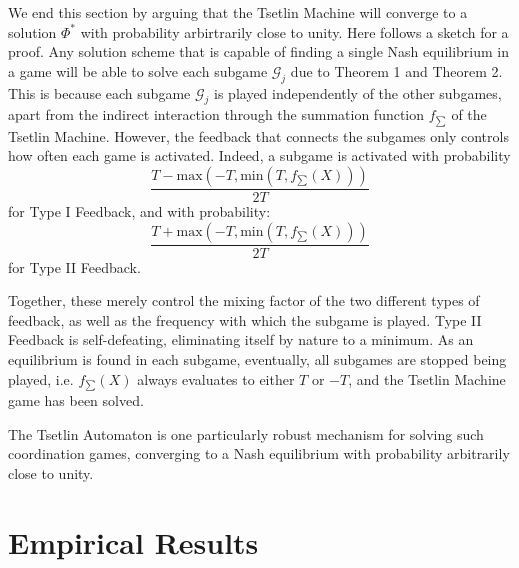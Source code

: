 \documentclass[11pt,a4paper]{article}
\begin{document}
We end this section by arguing that the Tsetlin Machine will converge to a solution $\Phi^*$ with probability arbirtrarily close to unity. Here follows a sketch for a proof. Any solution scheme that is capable of finding a single Nash equilibrium in a game will be able to solve each subgame  $\mathcal{G}_j$ due to Theorem 1 and Theorem 2. This is because each subgame  $\mathcal{G}_j$ is played independently of the other subgames, apart from the indirect interaction through the summation function $f_{\sum}$ of the Tsetlin Machine. However, the feedback that connects the subgames only controls how often each game is activated. Indeed, a subgame is activated with probability 
\begin{equation}
    \frac{T - \mathrm{max}(-T, \mathrm{min}(T, f_{\sum}(X)))}{2T}
\end{equation}
for Type I Feedback, and with probability: 
\begin{equation}
    \frac{T + \mathrm{max}(-T, \mathrm{min}(T, f_{\sum}(X)))}{2T}
\end{equation}
for Type II Feedback. 

Together, these merely control the mixing factor of the two different types of feedback, as well as the frequency with which the subgame is played. Type II Feedback is self-defeating, eliminating itself by nature to a minimum. As an equilibrium is found in each subgame, eventually, all subgames are stopped being played, i.e. $f_{\sum}(X)$ always evaluates to either $T$ or $-T$, and the Tsetlin Machine game has been solved.

The Tsetlin Automaton is one particularly robust mechanism for solving such coordination games, converging to a Nash equilibrium with probability arbitrarily close to unity.

\section{Empirical Results}
\label{sec:empirical_results}
\end{document}
